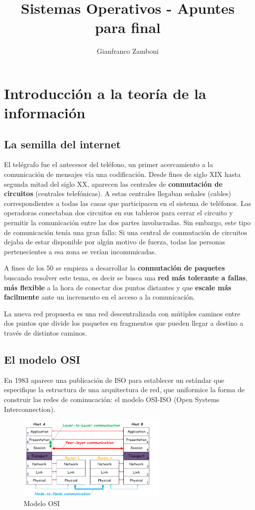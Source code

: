 \documentclass[10pt,a4paper]{article}
\title{Sistemas Operativos - Apuntes para final}
\author{Gianfranco Zamboni}
\begin{document}
	\maketitle
	\tableofcontents

\newpage
\section{Introducción a la teoría de la información}
\subsection{La semilla del internet }

El telégrafo fue el antecesor del teléfono, un primer acercamiento a la comunicación de
mensajes vía una codificación. Desde fines de siglo XIX hasta segunda mitad del siglo XX,
aparecen las centrales de \textbf{conmutación de circuitos} (centrales telefónicas). A estas centrales
llegaban señales (cables) correspondientes a todas las casas que participacen en el sistema de
teléfonos. Las operadoras conectaban dos circuitos en sus tableros para cerrar el circuito y
permitir la comunicación entre las dos partes involucradas. Sin embargo, este tipo de comunicación tenía una gran falla: Si una central de conmutación de circuitos
dejaba de estar disponible por algún motivo de fuerza, todas las personas pertenecientes a esa
zona se verían incomunicadas.


A fines de los 50 se empieza a desarrollar la \textbf{conmutación de paquetes} buscando resolver este tema, es decir se busca una \textbf{red más tolerante a fallas}, \textbf{más flexible} a la hora de conectar dos puntos distantes y que \textbf{escale más facilmente} ante un incremento en el acceso a la comunicación.

La nueva red propuesta es una red descentralizada con mútiples caminos entre dos puntos que divide los paquetes en fragmentos que pueden llegar a destino a través de distintos caminos.

\subsection*{El modelo OSI}
En 1983 aparece una publicación de ISO para establecer un estándar que especifique la estructura de una arquitectura de red, que uniformice la forma de construir las redes de cominucación: el modelo OSI-ISO (Open Systems Interconnection).

\begin{figure}[h]
	\centering
	\includegraphics[width=0.65\textwidth
]{images/osi.png}
	\caption[Modelo OSI de Referencia]{Modelo OSI}
	\label{fig:osi}
\end{figure}
\end{document}
